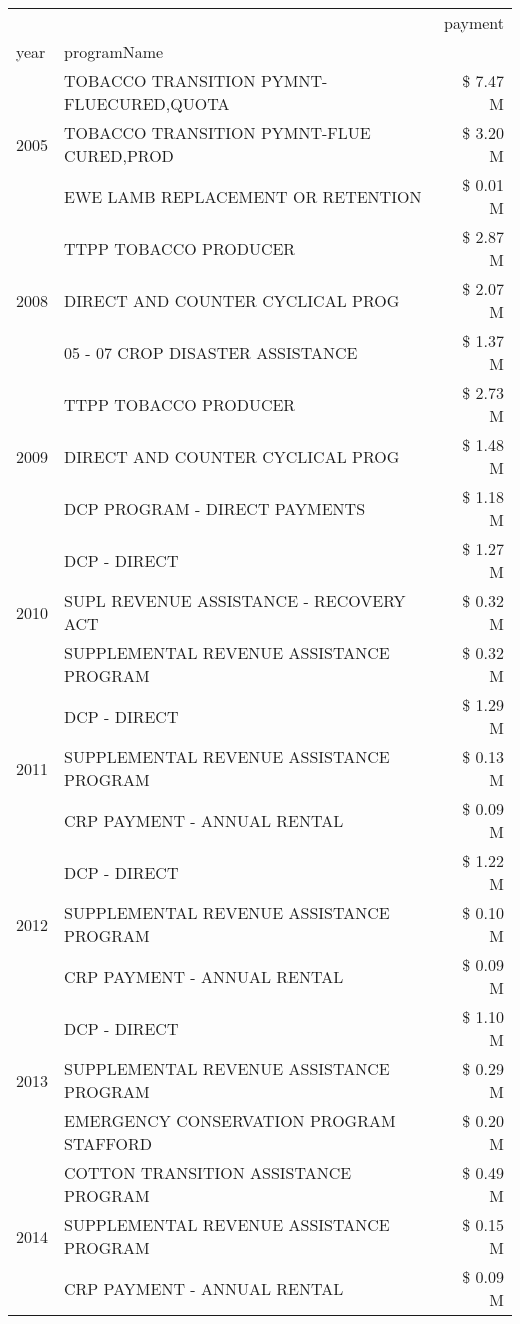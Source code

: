 \begin{tabular}{llr}
\toprule
 &  & payment \\
year & programName &  \\
\midrule
\multirow[t]{3}{*}{2005} & TOBACCO TRANSITION PYMNT-FLUECURED,QUOTA & \$ 7.47 M \\
 & TOBACCO TRANSITION PYMNT-FLUE CURED,PROD & \$ 3.20 M \\
 & EWE LAMB REPLACEMENT OR RETENTION & \$ 0.01 M \\
\cline{1-3}
\multirow[t]{3}{*}{2008} & TTPP TOBACCO PRODUCER & \$ 2.87 M \\
 & DIRECT AND COUNTER CYCLICAL PROG & \$ 2.07 M \\
 & 05 - 07 CROP DISASTER ASSISTANCE & \$ 1.37 M \\
\cline{1-3}
\multirow[t]{3}{*}{2009} & TTPP TOBACCO PRODUCER & \$ 2.73 M \\
 & DIRECT AND COUNTER CYCLICAL PROG & \$ 1.48 M \\
 & DCP PROGRAM - DIRECT PAYMENTS & \$ 1.18 M \\
\cline{1-3}
\multirow[t]{3}{*}{2010} & DCP - DIRECT & \$ 1.27 M \\
 & SUPL REVENUE ASSISTANCE - RECOVERY ACT & \$ 0.32 M \\
 & SUPPLEMENTAL REVENUE ASSISTANCE PROGRAM & \$ 0.32 M \\
\cline{1-3}
\multirow[t]{3}{*}{2011} & DCP - DIRECT & \$ 1.29 M \\
 & SUPPLEMENTAL REVENUE ASSISTANCE PROGRAM & \$ 0.13 M \\
 & CRP PAYMENT - ANNUAL RENTAL & \$ 0.09 M \\
\cline{1-3}
\multirow[t]{3}{*}{2012} & DCP - DIRECT & \$ 1.22 M \\
 & SUPPLEMENTAL REVENUE ASSISTANCE PROGRAM & \$ 0.10 M \\
 & CRP PAYMENT - ANNUAL RENTAL & \$ 0.09 M \\
\cline{1-3}
\multirow[t]{3}{*}{2013} & DCP - DIRECT & \$ 1.10 M \\
 & SUPPLEMENTAL REVENUE ASSISTANCE PROGRAM & \$ 0.29 M \\
 & EMERGENCY CONSERVATION PROGRAM STAFFORD & \$ 0.20 M \\
\cline{1-3}
\multirow[t]{3}{*}{2014} & COTTON TRANSITION ASSISTANCE PROGRAM & \$ 0.49 M \\
 & SUPPLEMENTAL REVENUE ASSISTANCE PROGRAM & \$ 0.15 M \\
 & CRP PAYMENT - ANNUAL RENTAL & \$ 0.09 M \\

\end{tabular}
